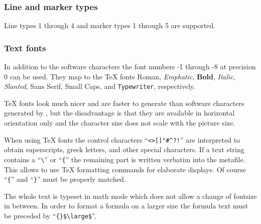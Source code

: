 \subsubsection{Line and marker types}

Line types 1 through 4 and marker types 1 through 5 are supported.

\subsubsection{Text fonts}

In addition to the software characters the font numbers -1 through -8 at
precision 0 can
be used. They map to the \TeX{} fonts {\rm Roman}, {\em Emphatic}, {\bf Bold},
{\it Italic}, {\sl Slanted}, {\sf Sans Serif}, {\sc Small Caps}, and
{\tt Typewriter}, respectively.
\par
\TeX{} fonts look much nicer and are faster to generate than software
characters generated by , but the disadvantage is that they are
available in horizontal orientation only and the character size does not scale
with the picture size.
\par
When using \TeX{} fonts the  control characters
``\verb'<>[]"#^?!''' are interpreted to obtain superscripts, greek letters, and
other special characters. If a text string contains a ``\verb'\''' or
``\verb'{''' the remaining part is written verbatim into the metafile.
This allows to use \TeX{} formatting commands for elaborate displays.
Of course ``\verb'{''' and ``\verb'}''' must be properly matched.
\par
The whole text is typeset in math mode which does not allow a change of
fontsize in between. In order to format a formula on a larger size the formula
text must be preceded by ``\verb'{}$\large$'''.
\par
%

